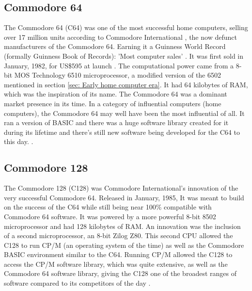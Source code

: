 \subsection{Commodore 64}
The Commodore 64 (C64) was one of the most successful home computers, selling over 17 million units according to Commodore International 
\cite{RN42}, the now defunct manufacturers of the Commodore 64. Earning it a Guinness World Record (formally Guinness Book of Records): 'Most computer sales'
\cite{RN43}.
It was first sold in January, 1982, for US\$595 at launch 
\cite{RN28}. The computational power came from a 8-bit MOS Technology 6510 microprocessor, a modified version of the 6502 mentioned in section \ref{sec: Early home computer era}. It had 64 kilobytes of RAM, which was the inspiration of its name. The Commodore 64 was a dominant market presence in its time. In a category of influential computers (home computers), the Commodore 64 may well have been the most influential of all. It ran a version of BASIC and there was a huge software library created for it during its lifetime and there's still new software being developed for the C64 to this day.
\cite{RN82}\cite{RN83}\cite{RN84}.

\subsection{Commodore 128}
The Commodore 128 (C128) was Commodore International's innovation of the very successful Commodore 64. Released in January, 1985, It was meant to build on the success of the C64 while still being near 100\% compatible with Commodore 64 software. It was powered by a more powerful 8-bit 8502 microprocessor and had 128 kilobytes of RAM. An innovation was the inclusion of a second microprocessor, an 8-bit Zilog Z80. This second CPU allowed the C128 to run CP/M (an operating system of the time) as well as the Commodore BASIC environment similar to the C64. Running CP/M allowed the C128 to access the CP/M software library, which was quite extensive, as well as the Commodore 64 software library, giving the C128 one of the broadest ranges of software compared to its competitors of the day
\cite{RN32}.

